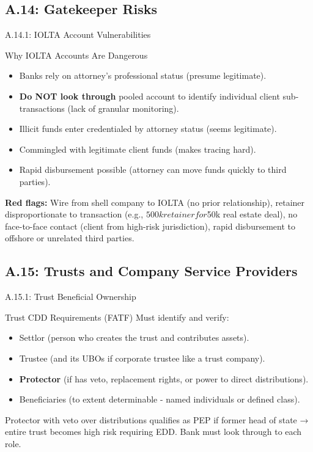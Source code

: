 \documentclass{beamer}
\begin{document}
	\subsection{A.14: Gatekeeper Risks}
	
	\begin{frame}{A.14.1: IOLTA Account Vulnerabilities}
		\begin{block}{Why IOLTA Accounts Are Dangerous}
			\begin{itemize}
				\item Banks rely on attorney's professional status (presume legitimate).
				\item \textbf{Do NOT look through} pooled account to identify individual client sub-transactions (lack of granular monitoring).
				\item Illicit funds enter credentialed by attorney status (seems legitimate).
				\item Commingled with legitimate client funds (makes tracing hard).
				\item Rapid disbursement possible (attorney can move funds quickly to third parties).
			\end{itemize}
		\end{block}
		\textbf{Red flags:} Wire from shell company to IOLTA (no prior relationship), retainer disproportionate to transaction (e.g., $500k retainer for $50k real estate deal), no face-to-face contact (client from high-risk jurisdiction), rapid disbursement to offshore or unrelated third parties.
	\end{frame}
	
	\subsection{A.15: Trusts and Company Service Providers}
	
	\begin{frame}{A.15.1: Trust Beneficial Ownership}
		\begin{block}{Trust CDD Requirements (FATF)}
			Must identify and verify:
			\begin{itemize}
				\item Settlor (person who creates the trust and contributes assets).
				\item Trustee (and its UBOs if corporate trustee like a trust company).
				\item \textbf{Protector} (if has veto, replacement rights, or power to direct distributions).
				\item Beneficiaries (to extent determinable - named individuals or defined class).
			\end{itemize}
		\end{block}
		\textcolor{red}{\textbf{}} Protector with veto over distributions qualifies as PEP if former head of state → entire trust becomes high risk requiring EDD. Bank must look through to each role.
	\end{frame}
	
\end{document}
